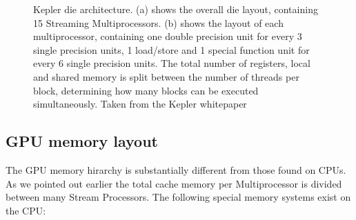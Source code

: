 \begin{figure}[ht!]
\begin{mdframed}
\begin{subfigure}[b]{0.6\textwidth}
    \caption{}
  \end{subfigure}
  \caption[Kepler architecture]{Kepler die architecture. (a) shows the overall die layout, containing 15 Streaming Multiprocessors. (b) shows the layout of each multiprocessor, containing one double precision unit for every 
				3 single precision units, 1 load/store and 1 special function unit for every 6 single precision units. The total number of registers, local and shared memory is split between the number of threads per 
				block, determining how many blocks can be executed simultaneously. Taken from the Kepler whitepaper \cite{kepler}}
  \label{fig_kepler_arch}
 \end{mdframed}
\end{figure}

\subsection{GPU memory layout}
The GPU memory hirarchy is substantially different from those found on CPUs. As we pointed out earlier the total cache memory
per Multiprocessor is divided between many Stream Processors. The following special memory systems exist on the CPU:
